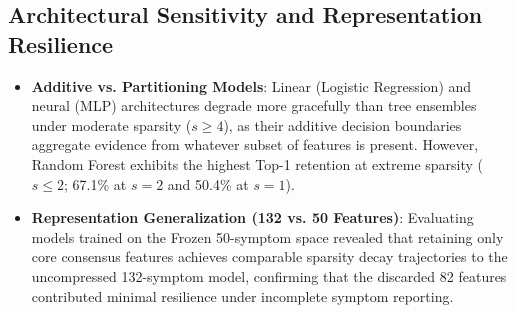 \subsection{Architectural Sensitivity and Representation Resilience}
\begin{itemize}
    \item \textbf{Additive vs. Partitioning Models}: Linear (Logistic Regression) and neural (MLP) architectures degrade more gracefully than tree ensembles under moderate sparsity ($s \ge 4$), as their additive decision boundaries aggregate evidence from whatever subset of features is present. However, Random Forest exhibits the highest Top-1 retention at extreme sparsity ($s \le 2$; 67.1\% at $s=2$ and 50.4\% at $s=1$).
    \item \textbf{Representation Generalization (132 vs. 50 Features)}: Evaluating models trained on the Frozen 50-symptom space revealed that retaining only core consensus features achieves comparable sparsity decay trajectories to the uncompressed 132-symptom model, confirming that the discarded 82 features contributed minimal resilience under incomplete symptom reporting.
\end{itemize}
